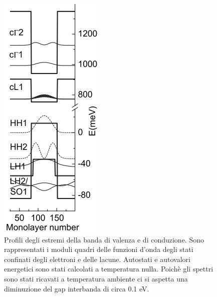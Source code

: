 \begin{figure}[h!]
    \centering
    \includegraphics{Images/QWStates.png}
    \caption{Profili degli estremi della banda di valenza e di conduzione. Sono rappresentati i moduli quadri delle funzioni d'onda degli stati confinati degli elettroni e delle lacune. Autostati e autovalori energetici sono stati calcolati a temperatura nulla. Poichè gli spettri sono stati ricavati a temperatura ambiente ci si aspetta una diminuzione del gap interbanda di circa 0.1 eV.}
    \label{fig:my_label}
\end{figure}